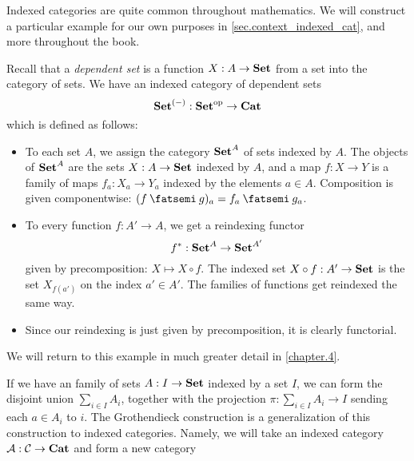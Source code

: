 \documentclass[DynamicalBook]{subfiles}
\begin{document}
Indexed categories are quite common throughout mathematics. We will construct a
particular example for our own purposes in \cref{sec.context_indexed_cat}, and
more throughout the book.

\begin{example}\label{ex.indexed_cat_of_dependent_sets}
  Recall that a \emph{dependent set} is a function $X : A \to \textbf{Set}$ from a set
  into the category of sets. We have an indexed category of dependent sets
  $$\textbf{Set}^{(-)} : \textbf{Set}^{\textnormal{op}} \to \textbf{Cat}$$
  which is defined as follows:
  \begin{itemize}
    \item To each set $A$, we assign the category $\textbf{Set}^A$ of sets indexed by
      $A$. The objects of $\textbf{Set}^A$ are the sets $X : A \to \textbf{Set}$ indexed by
      $A$, and a map $f : X \to Y$ is a family of maps $f_a : X_a \to Y_a$
      indexed by the elements $a \in A$. Composition is given componentwise: $(f \then g)_a = f_a \then g_a$.
    \item To every function $f : A' \to A$, we get a reindexing functor
$$f^{\ast} : \textbf{Set}^A \to \textbf{Set}^{A'}$$
   given by precomposition: $X \mapsto X \circ f$. The indexed set $X \circ f :
   A' \to \textbf{Set}$ is the set $X_{f(a')}$ on the index $a' \in A'$. The families
   of functions get reindexed the same way.
     \item Since our reindexing is just given by precomposition, it is clearly
       functorial.
  \end{itemize}
  We will return to this example in much greater detail in \cref{chapter.4}.
\end{example} 


If we have an family of sets $A : I \to \textbf{Set}$ indexed by a set $I$, we can
form the disjoint union $\sum_{i \in I} A_i$, together with the projection $\pi
: \sum_{i \in I} A_i \to I$ sending each $a \in A_i$ to $i$. The Grothendieck
construction is a generalization of this construction to indexed categories. Namely, we will take an indexed category $\mathcal{A}
: \mathcal{C} \to \textbf{Cat}$ and form a new category
\end{document}
